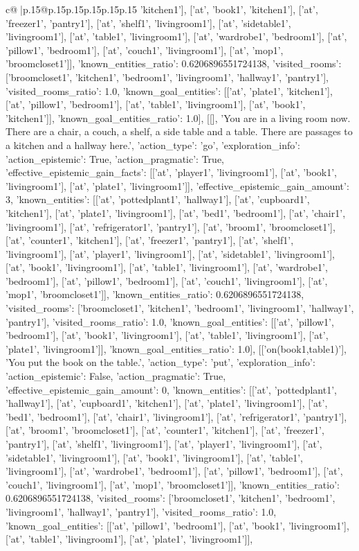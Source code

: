 \documentclass{article}
\begin{document}
{\begin{supertabular}{c@{$\;$}|p{.15\linewidth}@{}p{.15\linewidth}p{.15\linewidth}p{.15\linewidth}p{.15\linewidth}p{.15\linewidth}}
{{{'kitchen1'], ['at', 'book1', 'kitchen1'], ['at', 'freezer1', 'pantry1'], ['at', 'shelf1', 'livingroom1'], ['at', 'sidetable1', 'livingroom1'], ['at', 'table1', 'livingroom1'], ['at', 'wardrobe1', 'bedroom1'], ['at', 'pillow1', 'bedroom1'], ['at', 'couch1', 'livingroom1'], ['at', 'mop1', 'broomcloset1']], 'known_entities_ratio': 0.6206896551724138, 'visited_rooms': ['broomcloset1', 'kitchen1', 'bedroom1', 'livingroom1', 'hallway1', 'pantry1'], 'visited_rooms_ratio': 1.0, 'known_goal_entities': [['at', 'plate1', 'kitchen1'], ['at', 'pillow1', 'bedroom1'], ['at', 'table1', 'livingroom1'], ['at', 'book1', 'kitchen1']], 'known_goal_entities_ratio': 1.0}}], [[], 'You are in a living room now. There are a chair, a couch, a shelf, a side table and a table. There are passages to a kitchen and a hallway here.', {'action_type': 'go', 'exploration_info': {'action_epistemic': True, 'action_pragmatic': True, 'effective_epistemic_gain_facts': [['at', 'player1', 'livingroom1'], ['at', 'book1', 'livingroom1'], ['at', 'plate1', 'livingroom1']], 'effective_epistemic_gain_amount': 3, 'known_entities': [['at', 'pottedplant1', 'hallway1'], ['at', 'cupboard1', 'kitchen1'], ['at', 'plate1', 'livingroom1'], ['at', 'bed1', 'bedroom1'], ['at', 'chair1', 'livingroom1'], ['at', 'refrigerator1', 'pantry1'], ['at', 'broom1', 'broomcloset1'], ['at', 'counter1', 'kitchen1'], ['at', 'freezer1', 'pantry1'], ['at', 'shelf1', 'livingroom1'], ['at', 'player1', 'livingroom1'], ['at', 'sidetable1', 'livingroom1'], ['at', 'book1', 'livingroom1'], ['at', 'table1', 'livingroom1'], ['at', 'wardrobe1', 'bedroom1'], ['at', 'pillow1', 'bedroom1'], ['at', 'couch1', 'livingroom1'], ['at', 'mop1', 'broomcloset1']], 'known_entities_ratio': 0.6206896551724138, 'visited_rooms': ['broomcloset1', 'kitchen1', 'bedroom1', 'livingroom1', 'hallway1', 'pantry1'], 'visited_rooms_ratio': 1.0, 'known_goal_entities': [['at', 'pillow1', 'bedroom1'], ['at', 'book1', 'livingroom1'], ['at', 'table1', 'livingroom1'], ['at', 'plate1', 'livingroom1']], 'known_goal_entities_ratio': 1.0}}], [['on(book1,table1)'], 'You put the book on the table.', {'action_type': 'put', 'exploration_info': {'action_epistemic': False, 'action_pragmatic': True, 'effective_epistemic_gain_amount': 0, 'known_entities': [['at', 'pottedplant1', 'hallway1'], ['at', 'cupboard1', 'kitchen1'], ['at', 'plate1', 'livingroom1'], ['at', 'bed1', 'bedroom1'], ['at', 'chair1', 'livingroom1'], ['at', 'refrigerator1', 'pantry1'], ['at', 'broom1', 'broomcloset1'], ['at', 'counter1', 'kitchen1'], ['at', 'freezer1', 'pantry1'], ['at', 'shelf1', 'livingroom1'], ['at', 'player1', 'livingroom1'], ['at', 'sidetable1', 'livingroom1'], ['at', 'book1', 'livingroom1'], ['at', 'table1', 'livingroom1'], ['at', 'wardrobe1', 'bedroom1'], ['at', 'pillow1', 'bedroom1'], ['at', 'couch1', 'livingroom1'], ['at', 'mop1', 'broomcloset1']], 'known_entities_ratio': 0.6206896551724138, 'visited_rooms': ['broomcloset1', 'kitchen1', 'bedroom1', 'livingroom1', 'hallway1', 'pantry1'], 'visited_rooms_ratio': 1.0, 'known_goal_entities': [['at', 'pillow1', 'bedroom1'], ['at', 'book1', 'livingroom1'], ['at', 'table1', 'livingroom1'], ['at', 'plate1', 'livingroom1']], }}}
\end{supertabular}}
\end{document}
